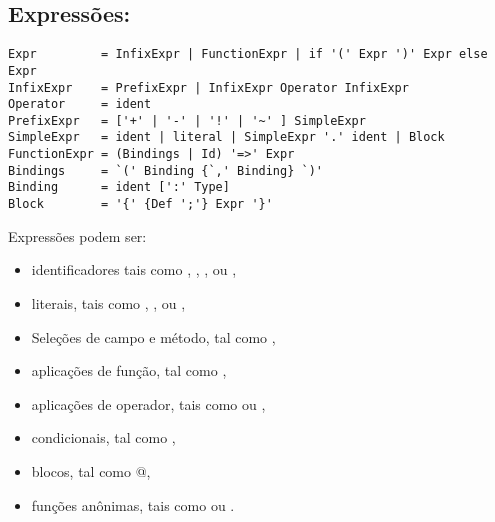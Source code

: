  \subsection*{Express\~{o}es:}
\begin{lstlisting}
Expr         = InfixExpr | FunctionExpr | if '(' Expr ')' Expr else Expr
InfixExpr    = PrefixExpr | InfixExpr Operator InfixExpr
Operator     = ident
PrefixExpr   = ['+' | '-' | '!' | '~' ] SimpleExpr
SimpleExpr   = ident | literal | SimpleExpr '.' ident | Block
FunctionExpr = (Bindings | Id) '=>' Expr
Bindings     = `(' Binding {`,' Binding} `)'
Binding      = ident [':' Type]
Block        = '{' {Def ';'} Expr '}'
\end{lstlisting}

Express\~{o}es podem ser:
 \begin{itemize}
 \item
identificadores tais como , , \code{*}, ou \code{+-},
 \item
literais, tais como , , ou ,
 \item
Sele\c{c}\~{o}es de campo e m\'{e}todo, tal como ,
 \item
aplica\c{c}\~{o}es de fun\c{c}\~{a}o, tal como ,
 \item
aplica\c{c}\~{o}es de operador, tais como  ou ,
 \item
condicionais, tal como ,
 \item
blocos, tal como @,
 \item
fun\c{c}\~{o}es an\^{o}nimas, tais como  ou .
 \end{itemize}

